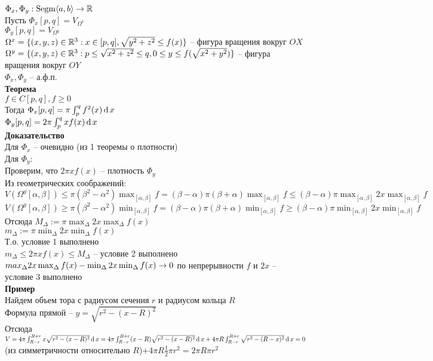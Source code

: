 \documentclass[12pt]{article}
\begin{document}
$\Phi_x, \Phi_y: \operatorname{Segm}\langle a, b \rangle \rightarrow \mathbb{R}$\\
Пусть $\Phi_x[p,q] = V_{\Omega^x}$\\
$\Phi_y[p,q] = V_{\Omega^y}$\\
$\Omega^x = \{(x,y,z) \in \mathbb{R}^3: x \in [p,q], \sqrt{y^2+z^2} \leq f(x)\}$ -- фигура вращения вокруг $OX$\\
$\Omega^y = \{(x,y,z) \in \mathbb{R}^3: p \leq \sqrt{x^2+z^2} \leq q, 0 \leq y \leq f(\sqrt{x^2+y^2}) \}$ -- фигура вращения вокруг $OY$\\
$\Phi_x, \Phi_y$ -- а.ф.п.\\
\textbf{Теорема}\\
$f\in C[p,q], f \geq 0$\\
Тогда $\Phi_x[p,q] = \pi\int_p^q f^2(x)\operatorname{d} x$\\
$\Phi_y[p,q] = 2\pi\int_p^q xf(x)\operatorname{d} x$\\
\textbf{Доказательство}\\
Для $\Phi_x$ -- очевидно (из 1 теоремы о плотности)\\
Для $\Phi_y$:\\
Проверим, что $2\pi xf(x)$ -- плотность $\Phi_y$\\
Из геометрических соображений:\\
$V(\Omega^y[\alpha, \beta]) \leq \pi(\beta^2 - \alpha^2)\max_{[\alpha, \beta]}f = (\beta-\alpha)\pi (\beta+\alpha)\max_{[\alpha, \beta]} f \leq (\beta - \alpha) \pi \max_{[\alpha, \beta]} 2x \max_{[\alpha, \beta]} f$\\
$V(\Omega^y[\alpha, \beta]) \geq \pi(\beta^2 - \alpha^2)\min_{[\alpha, \beta]}f = (\beta-\alpha)\pi (\beta+\alpha)\min_{[\alpha, \beta]} f \geq (\beta - \alpha) \pi \min_{[\alpha, \beta]} 2x \min_{[\alpha, \beta]} f$\\
Отсюда $M_\Delta := \pi \max_\Delta 2x \max_\Delta f(x)$\\
$m_\Delta := \pi \min_\Delta 2x \min_\Delta f(x)$\\
Т.о. условие 1 выполнено\\
$m_\Delta \leq 2\pi x f(x) \leq M_\Delta$ -- условие 2 выполнено\\
$max_\Delta 2x \max_\Delta f(x) - \min_\Delta 2x\min_\Delta f(x) \rightarrow 0$ по непрерывности $f$ и $2x$ -- условие 3 выполнено\\
\textbf{Пример}\\
Найдем объем тора с радиусом сечения $r$ и радиусом кольца $R$\\
Формула прямой -- $y = \sqrt{r^2 - (x-R)^2}$\\
Отсюда $V = 4\pi \int_{R-r}^{R+r} x\sqrt{r^2 - (x-R)^2} \operatorname{d} x = 4\pi \int_{R-r}^{R+r} (x-R)\sqrt{r^2-(x-R)^2}\operatorname{d} x + 4\pi R \int_{R-r}^{R+r} \sqrt{r^2-(R-x)^2}\operatorname{d} x = 0$(из симметричности относительно $R$)$ + 4\pi R\frac12 \pi r^2 = 2\pi R\pi r^2$\\
\end{document}
